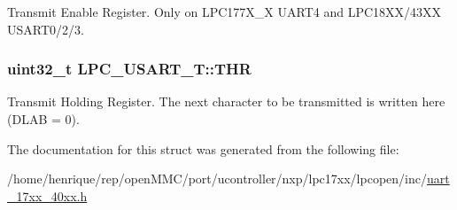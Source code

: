 Transmit Enable Register. Only on L\-P\-C177\-X\-\_\-X U\-A\-R\-T4 and L\-P\-C18\-X\-X/43\-X\-X U\-S\-A\-R\-T0/2/3. \hypertarget{structLPC__USART__T_ae93392fb8e6c40f5b340ec0cf145ee1b}{
\subsubsection[{T\-H\-R}]{ uint32\-\_\-t L\-P\-C\-\_\-\-U\-S\-A\-R\-T\-\_\-\-T\-::\-T\-H\-R}}\label{structLPC__USART__T_ae93392fb8e6c40f5b340ec0cf145ee1b}
Transmit Holding Register. The next character to be transmitted is written here (D\-L\-A\-B = 0). 

The documentation for this struct was generated from the following file\-:\begin{DoxyCompactItemize}
\item 
/home/henrique/rep/open\-M\-M\-C/port/ucontroller/nxp/lpc17xx/lpcopen/inc/\hyperlink{uart__17xx__40xx_8h}{uart\-\_\-17xx\-\_\-40xx.\-h}\end{DoxyCompactItemize}
